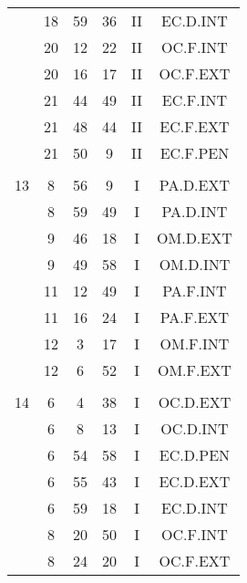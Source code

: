 \documentclass[12pt, a4paper]{article}
\begin{document}
\begin{multicols}{3}
{\begin{tabular}{c c c c c c}
	 	 	 	 & 18 & 59 & 36 & II & EC.D.INT\\%
	 	 	 	 & 20 & 12 & 22 & II & OC.F.INT\\%
	 	 	 	 & 20 & 16 & 17 & II & OC.F.EXT\\%
	 	 	 	 & 21 & 44 & 49 & II & EC.F.INT\\%
	 	 	 	 & 21 & 48 & 44 & II & EC.F.EXT\\%
	 	 	 	 & 21 & 50 & 9 & II & EC.F.PEN\\%
	 	 	 	 & & & & & \\%
	 	 	 	13 & 8 & 56 & 9 & I & PA.D.EXT\\%
	 	 	 	 & 8 & 59 & 49 & I & PA.D.INT\\%
	 	 	 	 & 9 & 46 & 18 & I & OM.D.EXT\\%
	 	 	 	 & 9 & 49 & 58 & I & OM.D.INT\\%
	 	 	 	 & 11 & 12 & 49 & I & PA.F.INT\\%
	 	 	 	 & 11 & 16 & 24 & I & PA.F.EXT\\%
	 	 	 	 & 12 & 3 & 17 & I & OM.F.INT\\%
	 	 	 	 & 12 & 6 & 52 & I & OM.F.EXT\\%
	 	 	 	 & & & & & \\%
	 	 	 	14 & 6 & 4 & 38 & I & OC.D.EXT\\%
	 	 	 	 & 6 & 8 & 13 & I & OC.D.INT\\%
	 	 	 	 & 6 & 54 & 58 & I & EC.D.PEN\\%
	 	 	 	 & 6 & 55 & 43 & I & EC.D.EXT\\%
	 	 	 	 & 6 & 59 & 18 & I & EC.D.INT\\%
	 	 	 	 & 8 & 20 & 50 & I & OC.F.INT\\%
	 	 	 	 & 8 & 24 & 20 & I & OC.F.EXT\\%

\end{tabular}}
\end{multicols}
\end{document}
